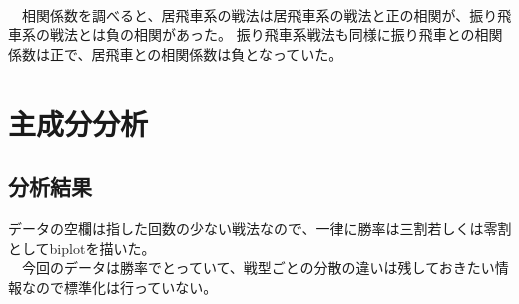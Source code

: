 \documentclass[11pt,a4paper,dvipdfmx]{jsarticle}
\begin{document}
\\
　相関係数を調べると、居飛車系の戦法は居飛車系の戦法と正の相関が、振り飛車系の戦法とは負の相関があった。
振り飛車系戦法も同様に振り飛車との相関係数は正で、居飛車との相関係数は負となっていた。
\\

\section{主成分分析}
\subsection{分析結果}
データの空欄は指した回数の少ない戦法なので、一律に勝率は三割若しくは零割としてbiplotを描いた。
\\
　今回のデータは勝率でとっていて、戦型ごとの分散の違いは残しておきたい情報なので標準化は行っていない。
\\
\end{document}
